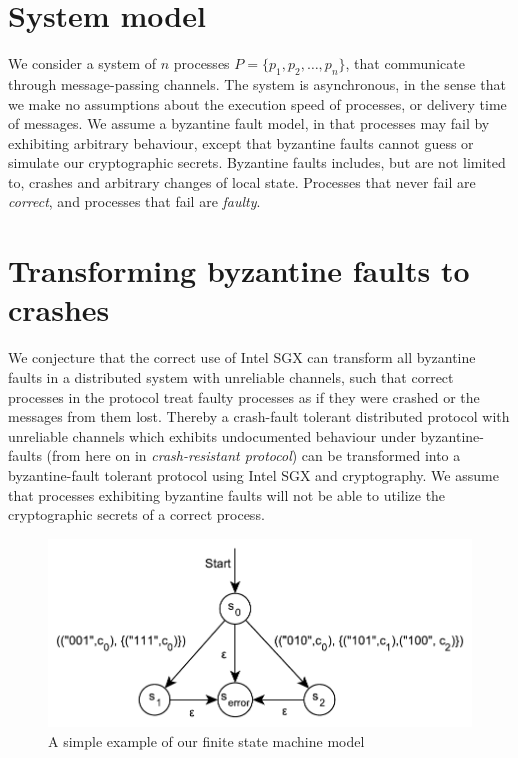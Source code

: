 \documentclass{article}
\begin{document}
	\section{System model}

	We consider a system of $n$ processes $P=\{p_1, p_2, \dots, p_n\}$, that communicate through message-passing channels.
	The system is asynchronous, in the sense that we make no assumptions about the execution speed of processes, or delivery time of messages.
	We assume a byzantine fault model, in that processes may fail by exhibiting arbitrary behaviour, except	that byzantine faults cannot guess or simulate our cryptographic secrets.
	Byzantine faults includes, but are not limited to, crashes and arbitrary changes of local state.
	Processes that never fail are \textit{correct}, and processes that fail are \textit{faulty}.

	\section{Transforming byzantine faults to crashes}
	\label{sec:transforming-byzantine-faults}

	We conjecture that the correct use of Intel SGX can transform all byzantine faults in a distributed system with unreliable channels, such that correct processes in the protocol treat faulty processes as if they were crashed or the messages from them lost.
	Thereby a crash-fault tolerant distributed protocol with unreliable channels which exhibits undocumented behaviour under byzantine-faults (from here on in \textit{crash-resistant protocol}) can be transformed into a byzantine-fault tolerant protocol using Intel SGX and cryptography.
	We assume that processes exhibiting byzantine faults will not be able to utilize the cryptographic secrets of a correct process.

	\begin{figure}[!ht]
		\center
		\includegraphics[scale=0.6]{figures/state-machines/simple-NFA.pdf}
		\caption{A simple example of our finite state machine model\label{fig:simple-nfa}}
	\end{figure}
\end{document}
